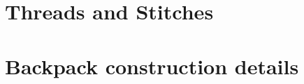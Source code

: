 \section{Threads and Stitches}


\section{Backpack construction details}\label{sec:construction-details}

